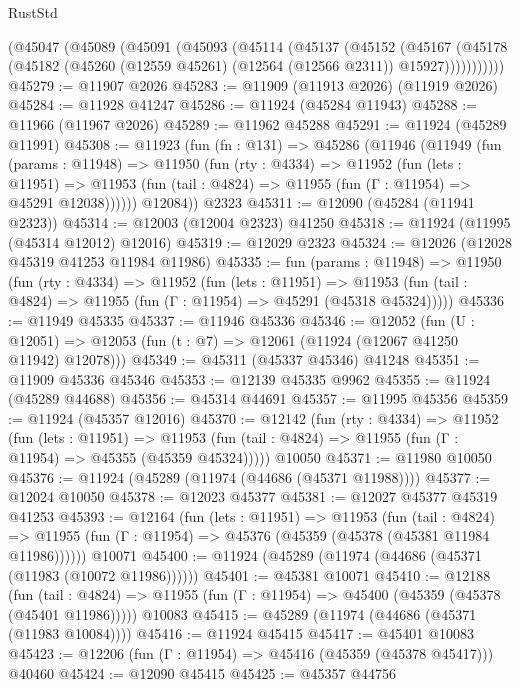 \begin{lexlean}{RustStd}
\begin{coremodule}
    (@45047
      (@45089
        (@45091
          (@45093
            (@45114
              (@45137
                (@45152
                  (@45167
                    (@45178
                      (@45182 (@45260 (@12559 @45261) (@12564 (@12566 @2311)) @15927)))))))))))
@45279 := @11907 @2026
@45283 := @11909 (@11913 @2026) (@11919 @2026)
@45284 := @11928 @41247
@45286 := @11924 (@45284 @11943)
@45288 := @11966 (@11967 @2026)
@45289 := @11962 @45288
@45291 := @11924 (@45289 @11991)
@45308 := @11923
    (fun (fn : @131) =>
    @45286
      (@11946
        (@11949
          (fun (params : @11948) =>
          @11950
            (fun (rty : @4334) =>
            @11952
              (fun (lets : @11951) =>
              @11953 (fun (tail : @4824) => @11955 (fun (Γ : @11954) => @45291 @12038))))))
        @12084))
    @2323
@45311 := @12090 (@45284 (@11941 @2323))
@45314 := @12003 (@12004 @2323) @41250
@45318 := @11924 (@11995 (@45314 @12012) @12016)
@45319 := @12029 @2323
@45324 := @12026 (@12028 @45319 @41253 @11984 @11986)
@45335 := fun (params : @11948) =>
  @11950
    (fun (rty : @4334) =>
    @11952
      (fun (lets : @11951) =>
      @11953 (fun (tail : @4824) => @11955 (fun (Γ : @11954) => @45291 (@45318 @45324)))))
@45336 := @11949 @45335
@45337 := @11946 @45336
@45346 := @12052
    (fun (U : @12051) => @12053 (fun (t : @7) => @12061 (@11924 (@12067 @41250 @11942) @12078)))
@45349 := @45311 (@45337 @45346) @41248
@45351 := @11909 @45336 @45346
@45353 := @12139 @45335 @9962
@45355 := @11924 (@45289 @44688)
@45356 := @45314 @44691
@45357 := @11995 @45356
@45359 := @11924 (@45357 @12016)
@45370 := @12142
    (fun (rty : @4334) =>
    @11952
      (fun (lets : @11951) =>
      @11953 (fun (tail : @4824) => @11955 (fun (Γ : @11954) => @45355 (@45359 @45324)))))
    @10050
@45371 := @11980 @10050
@45376 := @11924 (@45289 (@11974 (@44686 (@45371 @11988))))
@45377 := @12024 @10050
@45378 := @12023 @45377
@45381 := @12027 @45377 @45319 @41253
@45393 := @12164
    (fun (lets : @11951) =>
    @11953
      (fun (tail : @4824) =>
      @11955 (fun (Γ : @11954) => @45376 (@45359 (@45378 (@45381 @11984 @11986))))))
    @10071
@45400 := @11924 (@45289 (@11974 (@44686 (@45371 (@11983 (@10072 @11986))))))
@45401 := @45381 @10071
@45410 := @12188
    (fun (tail : @4824) => @11955 (fun (Γ : @11954) => @45400 (@45359 (@45378 (@45401 @11986)))))
    @10083
@45415 := @45289 (@11974 (@44686 (@45371 (@11983 @10084))))
@45416 := @11924 @45415
@45417 := @45401 @10083
@45423 := @12206 (fun (Γ : @11954) => @45416 (@45359 (@45378 @45417))) @40460
@45424 := @12090 @45415
@45425 := @45357 @44756

\end{coremodule}
\end{lexlean}
